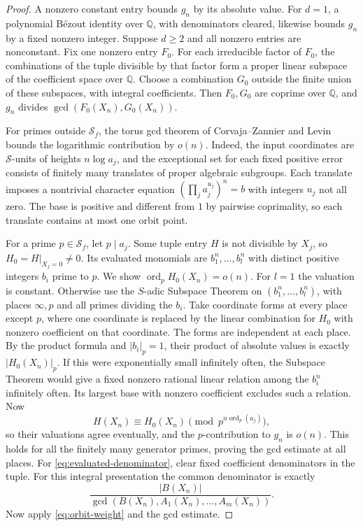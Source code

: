 \documentclass[11pt,a4paper,reqno]{amsart}
\theoremstyle{definition}
\theoremstyle{remark}
\numberwithin{equation}{section}
\begin{document}
\begin{proof}
A nonzero constant entry bounds \(g_n\) by its absolute value.
For \(d=1\), a polynomial B\'ezout identity over \(\mathbb Q\),
with denominators cleared, likewise bounds \(g_n\) by a fixed
nonzero integer. Suppose \(d\ge2\) and all nonzero entries are
nonconstant. Fix one nonzero entry \(F_0\). For each irreducible
factor of \(F_0\), the combinations of the tuple divisible by
that factor form a proper linear subspace of the coefficient
space over \(\mathbb Q\). Choose a combination \(G_0\) outside
the finite union of these subspaces, with integral coefficients.
Then \(F_0,G_0\) are coprime over \(\mathbb Q\), and \(g_n\) divides
\(\gcd(F_0(X_n),G_0(X_n))\).

For primes outside \(\mathcal S_f\), the torus gcd theorem of
Corvaja--Zannier and Levin \cite[Theorem~1.13(a)]{LW} bounds
the logarithmic contribution by \(o(n)\).
Indeed, the input coordinates are \(\mathcal S\)-units of heights
\(n\log a_j\), and the exceptional set for each fixed positive
error consists of finitely many translates of proper algebraic
subgroups. Each translate imposes a nontrivial character equation
\((\prod_j a_j^{u_j})^n=b\) with integers \(u_j\) not all zero.
The base is positive and different from \(1\) by pairwise
coprimality, so each translate contains at most one orbit point.

For a prime \(p\in\mathcal S_f\), let \(p\mid a_j\).
Some tuple entry \(H\) is not divisible by \(X_j\), so
\(H_0=H|_{X_j=0}\ne0\). Its evaluated monomials are \(b_1^n,\ldots,b_l^n\)
with distinct positive integers \(b_i\) prime to \(p\).
We show \(\operatorname{ord}_p H_0(X_n)=o(n)\).
For \(l=1\) the valuation is constant. Otherwise use the \(S\)-adic
Subspace Theorem on \((b_1^n,\ldots,b_l^n)\), with places
\(\infty,p\) and all primes dividing the \(b_i\). Take coordinate
forms at every place except \(p\), where one coordinate is replaced
by the linear combination for \(H_0\) with nonzero coefficient on
that coordinate. The forms are independent at each place.
By the product formula and \(|b_i|_p=1\), their product of
absolute values is exactly \(|H_0(X_n)|_p\).
If this were exponentially small infinitely often, the Subspace
Theorem would give a fixed nonzero rational linear relation
among the \(b_i^n\) infinitely often. Its largest base with
nonzero coefficient excludes such a relation.
Now
\[
 H(X_n)\equiv H_0(X_n)\pmod{p^{n\operatorname{ord}_p(a_j)}} ,
\]
so their valuations agree eventually, and the \(p\)-contribution
to \(g_n\) is \(o(n)\). This holds for all the finitely many
generator primes, proving the gcd estimate at all places.
For \eqref{eq:evaluated-denominator}, clear fixed coefficient
denominators in the tuple. For this integral presentation the common denominator is exactly
\[
 \frac{|B(X_n)|}{\gcd(B(X_n),A_1(X_n),\ldots,A_m(X_n))}.
\]
Now apply \eqref{eq:orbit-weight} and the gcd estimate.
\end{proof}
\end{document}
